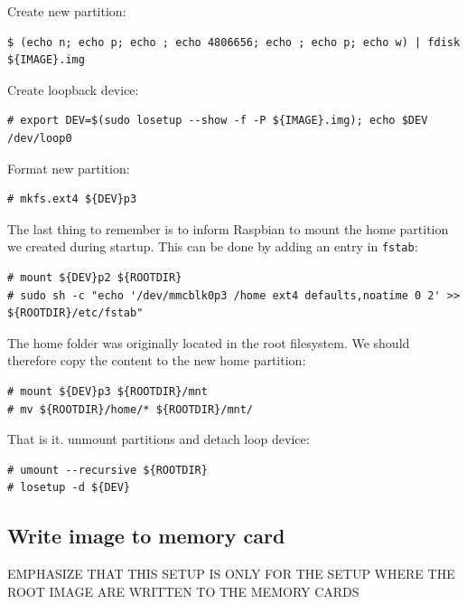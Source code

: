 Create new partition:

\begin{lstlisting}[]
$ (echo n; echo p; echo ; echo 4806656; echo ; echo p; echo w) | fdisk ${IMAGE}.img
\end{lstlisting}
\FloatBarrier
\vspace{-5mm}

Create loopback device: 
\begin{lstlisting}[]
# export DEV=$(sudo losetup --show -f -P ${IMAGE}.img); echo $DEV
/dev/loop0
\end{lstlisting}
\FloatBarrier
\vspace{-5mm}

Format new partition:
\begin{lstlisting}[]
# mkfs.ext4 ${DEV}p3
\end{lstlisting}
\FloatBarrier
\vspace{-5mm}

The last thing to remember is to inform Raspbian to mount the home partition
we created during startup. This can be done by adding an entry in \texttt{fstab}:
\begin{lstlisting}[]
# mount ${DEV}p2 ${ROOTDIR}
# sudo sh -c "echo '/dev/mmcblk0p3 /home ext4 defaults,noatime 0 2' >> ${ROOTDIR}/etc/fstab"
\end{lstlisting}
\FloatBarrier
\vspace{-5mm}

The home folder was originally located in the root filesystem. We should
therefore copy the content to the new home partition:
\begin{lstlisting}[]
# mount ${DEV}p3 ${ROOTDIR}/mnt
# mv ${ROOTDIR}/home/* ${ROOTDIR}/mnt/
\end{lstlisting}
\FloatBarrier
\vspace{-5mm}

That is it. unmount partitions and detach loop device:
\begin{lstlisting}[]
# umount --recursive ${ROOTDIR}
# losetup -d ${DEV}
\end{lstlisting}
\FloatBarrier
\vspace{-5mm}

\subsection{Write image to memory card}


EMPHASIZE THAT THIS SETUP IS ONLY FOR THE SETUP WHERE THE ROOT IMAGE ARE
WRITTEN TO THE MEMORY CARDS

